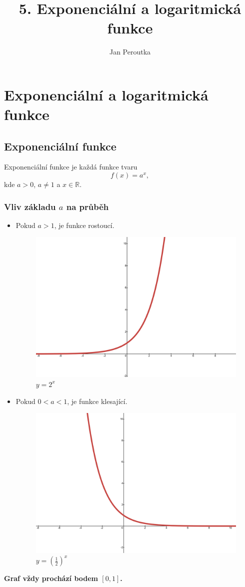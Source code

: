 \title{5. Exponenciální a logaritmická funkce}

\author{Jan Peroutka}
\maketitle

\section{Exponenciální a logaritmická funkce}

\subsection{Exponenciální funkce}
Exponenciální funkce je každá funkce tvaru
$$
f(x) = a^x,
$$
kde $a > 0$, $a \ne 1$ a $x \in \mathbb{R}$.

\subsubsection{Vliv základu $a$ na průběh}
\begin{itemize}
    \item Pokud $a > 1$, je funkce rostoucí.
\begin{figure}
            \centering
            \includegraphics[width=0.5\linewidth]{img/5_exp_ros.png}
            \caption{$y = 2^x$}
        \end{figure}
    \item Pokud $0 < a < 1$, je funkce klesající.
\begin{figure}
    \centering
    \includegraphics[width=0.5\linewidth]{img/5_exp_kles.png}
    \caption{$y = (\frac{1}{2})^x$}
\end{figure}
\end{itemize}
\textbf{Graf vždy prochází bodem $[0, 1]$.}

